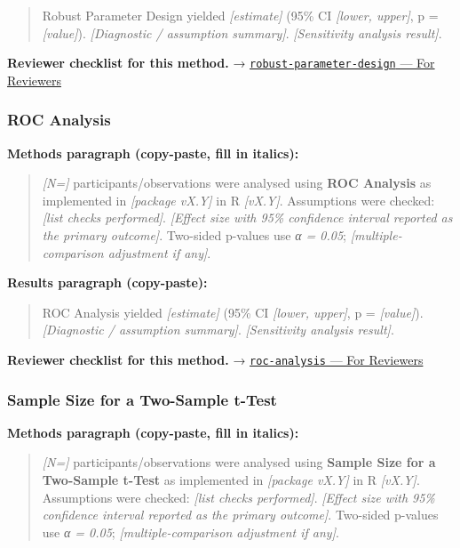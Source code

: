 \documentclass[
]{article}
\begin{document}
\begin{quote}
Robust Parameter Design yielded \emph{{[}estimate{]}} (95\% CI
\emph{{[}lower, upper{]}}, p = \emph{{[}value{]}}). \emph{{[}Diagnostic
/ assumption summary{]}}. \emph{{[}Sensitivity analysis result{]}}.
\end{quote}

\textbf{Reviewer checklist for this method.} →
\href{../chapters/16-design/robust-parameter-design.Rmd\#for-reviewers}{\texttt{robust-parameter-design}
--- For Reviewers}

\subsubsection{ROC Analysis}\label{roc-analysis}

\textbf{Methods paragraph (copy-paste, fill in italics):}

\begin{quote}
\emph{{[}N={]}} participants/observations were analysed using
\textbf{ROC Analysis} as implemented in \emph{{[}package vX.Y{]}} in R
\emph{{[}vX.Y{]}}. Assumptions were checked: \emph{{[}list checks
performed{]}}. \emph{{[}Effect size with 95\% confidence interval
reported as the primary outcome{]}}. Two-sided p-values use \emph{α =
0.05}; \emph{{[}multiple-comparison adjustment if any{]}}.
\end{quote}

\textbf{Results paragraph (copy-paste):}

\begin{quote}
ROC Analysis yielded \emph{{[}estimate{]}} (95\% CI \emph{{[}lower,
upper{]}}, p = \emph{{[}value{]}}). \emph{{[}Diagnostic / assumption
summary{]}}. \emph{{[}Sensitivity analysis result{]}}.
\end{quote}

\textbf{Reviewer checklist for this method.} →
\href{../chapters/14-clinical/roc-analysis.Rmd\#for-reviewers}{\texttt{roc-analysis}
--- For Reviewers}

\subsubsection{Sample Size for a Two-Sample
t-Test}\label{sample-size-for-a-two-sample-t-test}

\textbf{Methods paragraph (copy-paste, fill in italics):}

\begin{quote}
\emph{{[}N={]}} participants/observations were analysed using
\textbf{Sample Size for a Two-Sample t-Test} as implemented in
\emph{{[}package vX.Y{]}} in R \emph{{[}vX.Y{]}}. Assumptions were
checked: \emph{{[}list checks performed{]}}. \emph{{[}Effect size with
95\% confidence interval reported as the primary outcome{]}}. Two-sided
p-values use \emph{α = 0.05}; \emph{{[}multiple-comparison adjustment if
any{]}}.
\end{quote}
\end{document}

